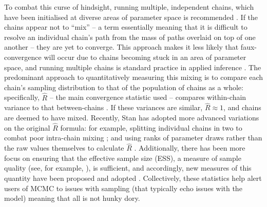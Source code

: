 \documentclass{article}
\begin{document}
To combat this curse of hindsight, running multiple, independent chains, which have been initialised at diverse areas of parameter space is recommended \citep{gelman1992inference}. If the chains appear not to ``mix'' -- a term essentially meaning that it is difficult to resolve an individual chain's path from the mass of paths overlaid on top of one another -- they are yet to converge. This approach makes it less likely that faux-convergence will occur due to chains becoming stuck in an area of parameter space, and running multiple chains is standard practice in applied inference \citep{lambert2018Student}. The predominant approach to quantitatively measuring this mixing is to compare each chain's sampling distribution to that of the population of chains as a whole: specifically, $\widehat{R}$ -- the main convergence statistic used -- compares within-chain variance to that between-chains \citep{gelman1992inference}. If these variances are similar, $\widehat{R}\approx 1$, and chains are deemed to have mixed. Recently, Stan has adopted more advanced variations on the original $\widehat{R}$ formula: for example, splitting individual chains in two to combat poor intra-chain mixing \citep{gelman2013bayesian}; and using ranks of parameter draws rather than the raw values themselves to calculate $\widehat{R}$ \citep{vehtari2019rank}. Additionally, there has been more focus on ensuring that the effective sample size (ESS), a measure of sample quality (see, for example, \citep{lambert2018Student}), is sufficient, and accordingly, new measures of this quantity have been proposed \citep{vehtari2019rank} and adopted \citep{carpenter2017stan}. Collectively, these statistics help alert users of MCMC to issues with sampling (that typically echo issues with the model) meaning that all is not hunky dory.
\end{document}
